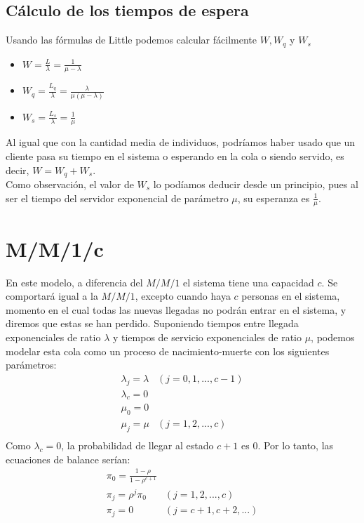 	\subsection{C\'alculo de los tiempos de espera}
	Usando las f\'ormulas de Little podemos calcular f\'acilmente $W,W_q$ y $W_s$
		\begin{itemize}
			\item $W=\displaystyle\frac{L}{\lambda}=\frac{1}{\mu-\lambda}$
			\item $W_q=\displaystyle\frac{L_q}{\lambda}=\frac{\lambda}{\mu(\mu-\lambda)}$
			\item$W_s=\displaystyle\frac{L_s}{\lambda}=\frac{1}{\mu}$
		\end{itemize}
	\hspace{0.5cm}Al igual que con la cantidad media de individuos, podr\'iamos haber usado que un cliente pasa su tiempo en el sistema o esperando en la cola o siendo servido, es decir, $W=W_q+W_s$. \\
	\hspace{0.5cm}Como observaci\'on, el valor de $W_s$ lo pod\'iamos deducir desde un principio, pues al ser el tiempo del servidor exponencial de par\'ametro $\mu$, su esperanza es $\displaystyle \frac{1}{\mu}$.
	
\section{M/M/1/c}
		En este modelo, a diferencia del $M/M/1$ el sistema tiene una capacidad $c$. Se comportará igual a la $M/M/1$, excepto cuando haya $c$ personas en el sistema, momento en el cual todas las nuevas llegadas no podrán entrar en el sistema, y diremos que estas se han perdido. Suponiendo tiempos entre llegada exponenciales de ratio $\lambda$ y tiempos de servicio exponenciales de ratio $\mu$, podemos modelar esta cola como un proceso de nacimiento-muerte con los siguientes par\'ametros:
		$$\begin{array}{cc}
		\lambda_j=\lambda & (j=0,1,...,c-1)\\
		\lambda_c=0 & \\
		\mu_0=0 &  \\
		\mu_j=\mu &  (j=1,2,...,c)\\
		\end{array}$$
		\hspace{0.5cm} Como $\lambda_c=0$, la probabilidad de llegar al estado $c+1$ es $0$. Por lo tanto, las ecuaciones de balance ser\'ian:
			$$\begin{array}{cc}
		\pi_0=\displaystyle\frac{1-\rho}{1-\rho^{c+1}} & \\
		\pi_j=\rho^j\pi_0 & (j=1,2,...,c)\\
		\pi_j=0 & (j=c+1,c+2,...)\\
		\end{array}$$
